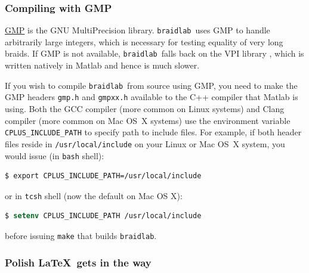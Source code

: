 \documentclass[12pt]{article}
\newcommand{\braidlab}{\texttt{braidlab}}%
\begin{document}
\subsubsection{Compiling with GMP}
\label{sec:gmp}

%
\href{https://gmplib.org/}{GMP} is the GNU MultiPrecision library.  \braidlab\
uses GMP to handle arbitrarily large integers, which is necessary for testing
equality of very long braids.  If GMP is not available, \braidlab\ falls back
on the VPI library \citep{vpi}, which is written natively in Matlab and hence
is much slower.

If you wish to compile \braidlab\ from source using GMP, you need to make the
GMP headers \lstinline{gmp.h} and \lstinline{gmpxx.h} available to the C++
compiler that Matlab is using. Both the %
%
GCC compiler (more common on Linux %
%
systems) and %
%
Clang compiler (more common on Mac OS~X systems) %
%
use the environment variable \lstinline{CPLUS_INCLUDE_PATH} to specify path to
include files. For example, if both header files reside in
\lstinline{/usr/local/include} on your Linux or Mac OS~X system, you would
issue (in \lstinline{bash} shell):
\begin{lstlisting}[frame=single,framerule=0pt,escapechar=*,%
  language=bash,backgroundcolor=\color{white}]
$ export CPLUS_INCLUDE_PATH=/usr/local/include
\end{lstlisting}
or in \lstinline{tcsh} shell (now the default on Mac OS X):
\begin{lstlisting}[frame=single,framerule=0pt,escapechar=*,%
  language=csh,backgroundcolor=\color{white}]
$ setenv CPLUS_INCLUDE_PATH /usr/local/include
\end{lstlisting}
before issuing \lstinline{make} that builds \lstinline{braidlab}.

%


\subsubsection{Polish \LaTeX\ gets in the way}
\end{document}
